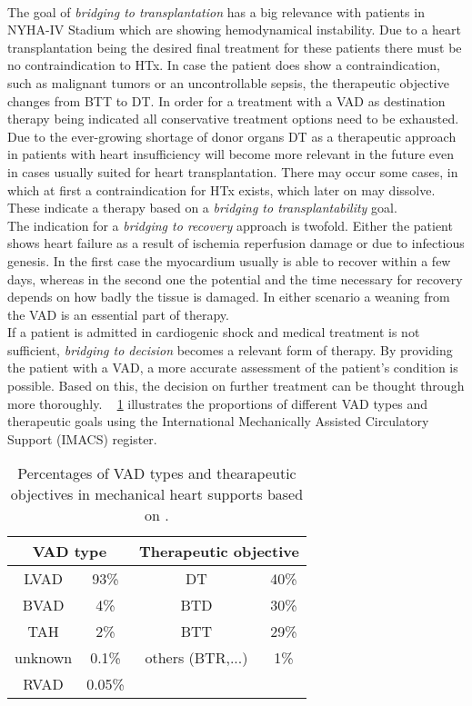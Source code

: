 \\The goal of \textit{bridging to transplantation} has a big relevance with patients in NYHA-IV Stadium which are showing hemodynamical instability. Due to a heart transplantation being the desired final treatment for these patients there must be no contraindication to HTx. In case the patient does show a contraindication, such as malignant tumors or an uncontrollable sepsis, the therapeutic objective changes from BTT to DT. In order for a treatment with a VAD as destination therapy being indicated all conservative treatment options need to be exhausted. Due to the ever-growing shortage of donor organs DT as a therapeutic approach in patients with heart insufficiency will become more relevant in the future even in cases usually suited for heart transplantation. \cite{VAD7} There may occur some cases, in which at first a contraindication for HTx exists, which later on may dissolve. These indicate a therapy based on a \textit{bridging to transplantability} goal. \cite{VAD6}
\\The indication for a \textit{bridging to recovery} approach is twofold. Either the patient shows heart failure as a result of ischemia reperfusion damage or due to infectious genesis. In the first case the myocardium usually is able to recover within a few days, whereas in the second one the potential and the time necessary for recovery depends on how badly the tissue is damaged. In either scenario a weaning from the VAD is an essential part of therapy. \cite{VAD7}
\\If a patient is admitted in cardiogenic shock and medical treatment is not sufficient, \textit{bridging to decision} becomes a relevant form of therapy. By providing the patient with a VAD, a more accurate assessment of the patient's condition is possible.
Based on this, the decision on further treatment can be thought through more thoroughly. \cite{VAD6} \tablename~ \ref{tab:Table2} illustrates the proportions of different VAD types and therapeutic goals using the International Mechanically Assisted Circulatory Support (IMACS) register.
\begin{table}
  \centering
  \begin{tabular}{cc|cc}
    \toprule
    \multicolumn{2}{c|}{VAD type} &
    \multicolumn{2}{c}{Therapeutic objective} \\
    \midrule
    LVAD & 93\% & DT & 40\%\\
    BVAD & 4\% & BTD & 30\%\\
    TAH & 2\% & BTT & 29\%\\
    unknown & 0.1\% & others (BTR,...) & 1\%\\
    RVAD & 0.05\% & &\\
    \bottomrule
\end{tabular}
  \caption{Percentages of VAD types and thearapeutic objectives in mechanical heart supports based on \cite{VAD7}.}
  \label{tab:Table2}
\end{table}

